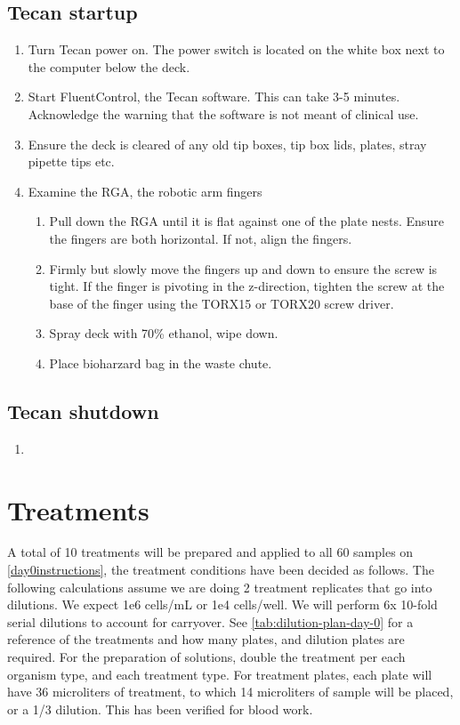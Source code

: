 \documentclass{article}
\begin{document}
\subsection{Tecan startup}
\label{sec:tecan-start}
\begin{enumerate}
\item Turn Tecan power on. The power switch is located on the white box next to the computer below the deck.
\item Start FluentControl, the Tecan software. This can take 3-5 minutes. Acknowledge the warning that the software is not meant of clinical use.
\item Ensure the deck is cleared of any old tip boxes, tip box lids, plates, stray pipette tips etc.
\item Examine the RGA, the robotic arm fingers
  \begin{enumerate}
  \item Pull down the RGA until it is flat against one of the plate nests. Ensure the fingers are both horizontal. If not, align the fingers.
  \item Firmly but slowly move the fingers up and down to ensure the screw is tight. If the finger is pivoting in the z-direction, tighten the screw at the base of the finger using the TORX15 or TORX20 screw driver.
  \item Spray deck with 70\% ethanol, wipe down.
  \item Place bioharzard bag in the waste chute.
  \end{enumerate}
\end{enumerate}


\subsection{Tecan shutdown}
\label{sec:tecan-shut}
\begin{enumerate}
\item 
\end{enumerate}

\section{Treatments} \label{treatments}
A total of 10 treatments will be prepared and applied to all 60 samples on  \ref{day0instructions}, the treatment conditions have been decided as follows. The following calculations assume we are doing 2 treatment replicates that go into dilutions. We expect 1e6 cells/mL or 1e4 cells/well. We will perform 6x 10-fold serial dilutions to account for carryover. See \ref{tab:dilution-plan-day-0} for a reference of the treatments and how many plates, and dilution plates are required. For the preparation of solutions, double the treatment per each organism type, and each treatment type. For treatment plates, each plate will have 36 microliters of treatment, to which 14 microliters of sample will be placed, or a 1/3 dilution. This has been verified for blood work.
\end{document}
